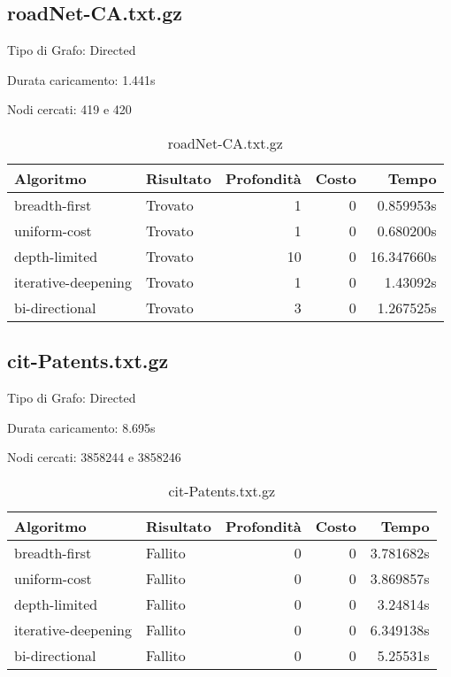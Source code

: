\subsection{roadNet-CA.txt.gz}
Tipo di Grafo: Directed

Durata caricamento: 1.441s

Nodi cercati: 419 e 420

\begin{table}[h]
	\centering
	\begin{tabular}{|l|l|r|r|r|}
		\hline
		\textbf{Algoritmo}  & \textbf{Risultato} & \textbf{Profondità} & \textbf{Costo} & \textbf{Tempo} \\
		\hline
		breadth-first       & Trovato            & 1                   & 0              & 0.859953s      \\
		uniform-cost        & Trovato            & 1                   & 0              & 0.680200s      \\
		depth-limited       & Trovato            & 10                  & 0              & 16.347660s     \\
		iterative-deepening & Trovato            & 1                   & 0              & 1.43092s       \\
		bi-directional      & Trovato            & 3                   & 0              & 1.267525s      \\
		\hline
	\end{tabular}
	\caption{roadNet-CA.txt.gz}
\end{table}
\newpage
\subsection{cit-Patents.txt.gz}
Tipo di Grafo: Directed

Durata caricamento: 8.695s

Nodi cercati: 3858244 e 3858246

\begin{table}[h]
	\centering
	\begin{tabular}{|l|l|r|r|r|}
		\hline
		\textbf{Algoritmo}  & \textbf{Risultato} & \textbf{Profondità} & \textbf{Costo} & \textbf{Tempo} \\
		\hline
		breadth-first       & Fallito            & 0                   & 0              & 3.781682s      \\
		uniform-cost        & Fallito            & 0                   & 0              & 3.869857s      \\
		depth-limited       & Fallito            & 0                   & 0              & 3.24814s       \\
		iterative-deepening & Fallito            & 0                   & 0              & 6.349138s      \\
		bi-directional      & Fallito            & 0                   & 0              & 5.25531s       \\
		\hline
	\end{tabular}
	\caption{cit-Patents.txt.gz}
\end{table}

